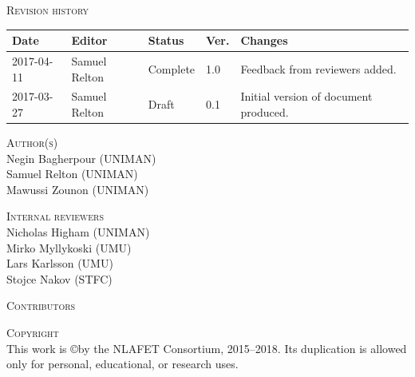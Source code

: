 \documentclass[a4paper,12pt]{article}
\begin{document}
\vspace{2em}




\noindent
\textsc{Revision history}\\[1em]
\begin{tabularx}{\linewidth}{@{}|l|l|l|l|X|}
  \hline
  \rowcolor{orange}
  \bf Date & \bf Editor & \bf Status & \bf Ver. & \bf Changes \\
  \hline
  2017-04-11 & Samuel Relton & Complete & 1.0 & Feedback from
                                                reviewers added.\\
  2017-03-27 & Samuel Relton & Draft & 0.1 & Initial version of
                                             document produced. \\
  \hline
\end{tabularx}

\vspace{2em}


\noindent
\textsc{Author(s)}\\[1em]
Negin Bagherpour (UNIMAN)\\
Samuel Relton (UNIMAN)\\
Mawussi Zounon (UNIMAN)

\vspace{2em}





\noindent
\textsc{Internal reviewers}\\[1em]
Nicholas Higham (UNIMAN)\\
Mirko Myllykoski (UMU)\\
Lars Karlsson (UMU)\\
Stojce Nakov (STFC)

\vspace{2em}






\noindent
\textsc{Contributors}\\[1em]

\vspace{2em}





\noindent
\textsc{Copyright}\\[1em]
This work is \copyright by the NLAFET Consortium, 2015--2018.
Its duplication is allowed only for personal, educational, or research uses.
\end{document}
